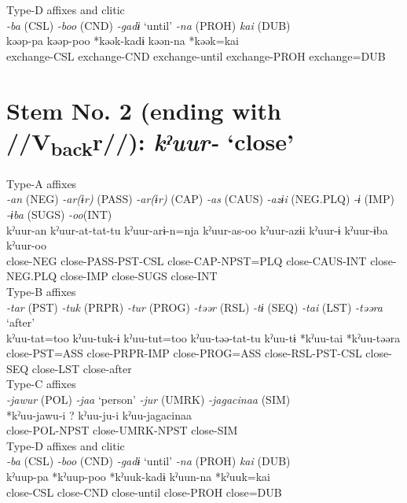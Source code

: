 \ex Type-D affixes and clitic\\
\glll \textit{-ba} (CSL)  \textit{-boo} (CND)  \textit{-gadɨ} ‘until’  \textit{-na} (PROH)  \textit{kai} (DUB)\\
kəəp-pa  kəəp-poo  *kəək-kadɨ  kəən-na  *kəək=kai\\
exchange-CSL  exchange-CND  exchange-until  exchange-PROH  exchange=DUB\\
\z

\section{Stem No. 2 (ending with //V\textsubscript{back}r//): \textit{kˀuur-} ‘close’}

\ea Type-A affixes\\
\glll \textit{-an} (NEG)  \textit{-ar(ɨr)} (PASS)  \textit{-ar(ɨr)} (CAP)  \textit{-as} (CAUS)  \textit{-azɨi} (NEG.PLQ)  \textit{-ɨ} (IMP)  \textit{-ɨba} (SUGS)  \textit{-oo}(INT)\\
kˀuur-an  kˀuur-at-tat-tu  kˀuur-arɨ-n=nja  kˀuur-as-oo  kˀuur-azɨi  kˀuur-ɨ  kˀuur-ɨba  kˀuur-oo\\
close-NEG  close-PASS-PST-CSL  close-CAP-NPST=PLQ  close-CAUS-INT  close-NEG.PLQ  close-IMP  close-SUGS  close-INT\\


\ex Type-B affixes\\
\glll \textit{-tar} (PST)  \textit{-tuk} (PRPR)  \textit{-tur} (PROG)  \textit{-təər} (RSL)  \textit{-tɨ} (SEQ)  \textit{-tai} (LST)  \textit{-təəra} ‘after’\\
kˀuu-tat=too  kˀuu-tuk-ɨ  kˀuu-tut=too  kˀuu-təə-tat-tu  kˀuu-tɨ  *kˀuu-tai  *kˀuu-təəra\\
close-PST=ASS  close-PRPR-IMP  close-PROG=ASS  close-RSL-PST-CSL  close-SEQ  close-LST  close-after\\


\ex Type-C affixes\\
\glll \textit{-jawur} (POL)  \textit{-jaa} ‘person’  \textit{-jur} (UMRK)  \textit{-jagacinaa} (SIM)\\
*kˀuu-jawu-i  ?  kˀuu-ju-i  kˀuu-jagacinaa\\
close-POL-NPST    close-UMRK-NPST  close-SIM\\


\ex Type-D affixes and clitic\\
\glll \textit{-ba} (CSL)  \textit{-boo} (CND)  \textit{-gadɨ} ‘until’  \textit{-na} (PROH)  \textit{kai} (DUB)\\
kˀuup-pa  *kˀuup-poo  *kˀuuk-kadɨ  kˀuun-na  *kˀuuk=kai\\
close-CSL  close-CND  close-until  close-PROH  close=DUB\\
\z

